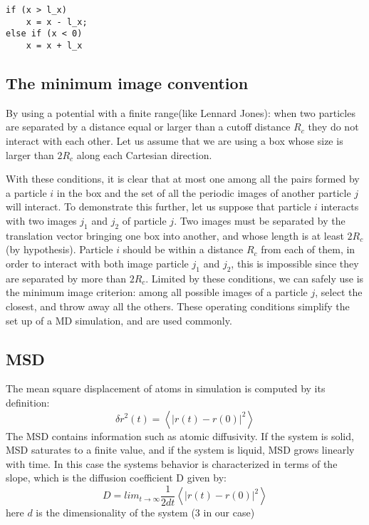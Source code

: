 \documentclass[a4paper]{article}
\begin{document}
\begin{lstlisting}
if (x > l_x)
	x = x - l_x;
else if (x < 0)
	x = x + l_x
\end{lstlisting}

\subsection{The minimum image convention}
By using a potential with a finite range(like Lennard Jones): when two particles are separated by a distance equal or larger than a cutoff distance $R_c$ they do not interact with each other. Let us assume that we are using a box whose size is larger than $2R_c$ along each Cartesian direction.

With these conditions, it is clear that at most one among all the pairs formed by a particle $i$ in the box and the set of all the periodic images of another particle $j$ will interact. To demonstrate this further, let us suppose that particle $i$ interacts with two images $j_1$ and $j_2$ of particle $j$.  Two images must be separated by the translation vector bringing one box into another, and whose length is at least $2R_c$ (by hypothesis). Particle $i$ should be within a distance $R_c$ from each of them, in order to interact with both image particle $j_1$ and $j_2$, this is impossible since they are separated by more than $2R_c$. Limited by these conditions, we can safely use is the minimum image criterion: among all possible images of a particle $j$, select the closest, and throw away all the others.  These operating conditions simplify the set up of a MD simulation, and are used commonly. 


\subsection{MSD}
The mean square displacement of atoms in simulation is computed by its definition:
\begin{equation}
\delta r^2(t) = \left<\left|r(t) - r(0)\right|^2 \right >
\end{equation}
The MSD contains information such as atomic diffusivity. If the system is solid, MSD saturates to a finite value, and if the system is liquid, MSD grows linearly with time. In this case the systems behavior is characterized in terms of the slope, which is the diffusion coefficient D given by:
\begin{equation}
D = lim_{t\rightarrow \infty} \frac{1}{2dt} \left<\left|r(t) - r(0)\right|^2 \right >
\end{equation}
here $d$ is the dimensionality of the system (3 in our case)
\end{document}
